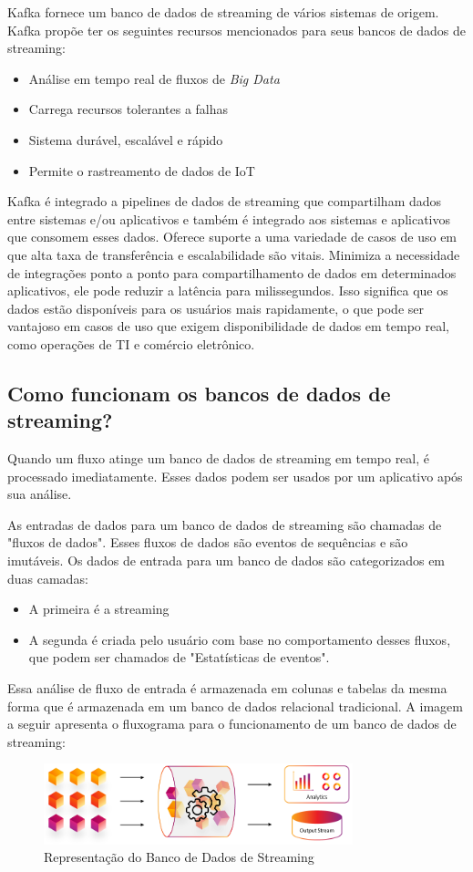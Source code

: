 \documentclass[a4paper,11pt]{article}
\begin{document}
Kafka fornece um banco de dados de streaming de vários sistemas de origem. Kafka propõe ter os seguintes recursos mencionados para seus bancos de dados de streaming: \vspace{-1em}
\begin{itemize}
	\item Análise em tempo real de fluxos de \textit{Big Data}
	\item Carrega recursos tolerantes a falhas
	\item Sistema durável, escalável e rápido
	\item Permite o rastreamento de dados de IoT 
\end{itemize}

Kafka é integrado a pipelines de dados de streaming que compartilham dados entre sistemas e/ou aplicativos e também é integrado aos sistemas e aplicativos que consomem esses dados. Oferece suporte a uma variedade de casos de uso em que alta taxa de transferência e escalabilidade são vitais. Minimiza a necessidade de integrações ponto a ponto para compartilhamento de dados em determinados aplicativos, ele pode reduzir a latência para milissegundos. Isso significa que os dados estão disponíveis para os usuários mais rapidamente, o que pode ser vantajoso em casos de uso que exigem disponibilidade de dados em tempo real, como operações de TI e comércio eletrônico. 

\subsection{Como funcionam os bancos de dados de streaming?}
Quando um fluxo atinge um banco de dados de streaming em tempo real, é processado imediatamente. Esses dados podem ser usados por um aplicativo após sua análise.

As entradas de dados para um banco de dados de streaming são chamadas de "fluxos de dados". Esses fluxos de dados são eventos de sequências e são imutáveis. Os dados de entrada para um banco de dados são categorizados em duas camadas: \vspace{-1em}
\begin{itemize}
	\item A primeira é a streaming
	\item A segunda é criada pelo usuário com base no comportamento desses fluxos, que podem ser chamados de "Estatísticas de eventos". 
\end{itemize}
	
Essa análise de fluxo de entrada é armazenada em colunas e tabelas da mesma forma que é armazenada em um banco de dados relacional tradicional. A imagem a seguir apresenta o fluxograma para o funcionamento de um banco de dados de streaming: 
\begin{figure}[H]
	\centering
	\includegraphics[width=0.8\textwidth]{imagem/BDStreaming}
	\caption{Representação do Banco de Dados de Streaming}
\end{figure}
\end{document}
